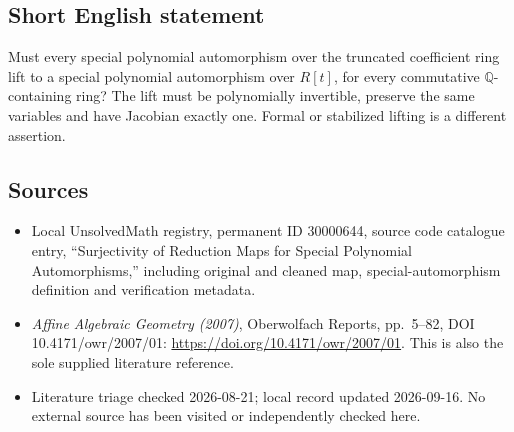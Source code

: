 \documentclass[11pt]{article}
\newcommand{\Q}{\mathbb{Q}}
\begin{document}
\subsection{Short English statement}
Must every special polynomial automorphism over the truncated coefficient ring lift to a special polynomial automorphism over \(R[t]\), for every commutative \(\Q\)-containing ring? The lift must be polynomially invertible, preserve the same variables and have Jacobian exactly one. Formal or stabilized lifting is a different assertion.
\subsection{Sources}
\begin{itemize}
\item Local UnsolvedMath registry, permanent ID 30000644, source code catalogue entry, ``Surjectivity of Reduction Maps for Special Polynomial Automorphisms,'' including original and cleaned map, special-automorphism definition and verification metadata.
\item \emph{Affine Algebraic Geometry (2007)}, Oberwolfach Reports, pp.\ 5--82, DOI 10.4171/owr/2007/01: \url{https://doi.org/10.4171/owr/2007/01}. This is also the sole supplied literature reference.
\item Literature triage checked 2026-08-21; local record updated 2026-09-16. No external source has been visited or independently checked here.
\end{itemize}
\end{document}
